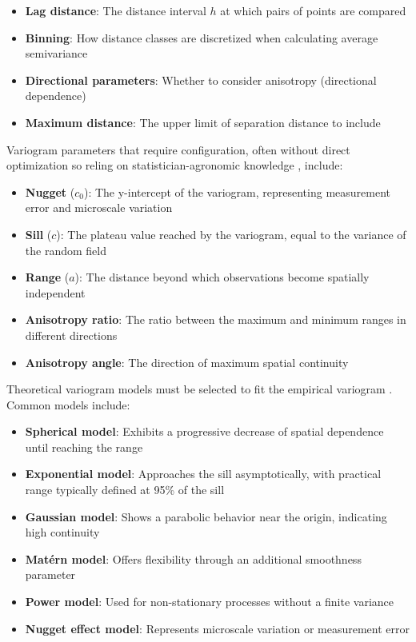 \documentclass[12pt,a4paper,oneside]{report}
\begin{document}
\begin{itemize} 
    \item \textbf{Lag distance}: The distance interval $h$ at which pairs of points are compared 
    \item \textbf{Binning}: How distance classes are discretized when calculating average semivariance 
    \item \textbf{Directional parameters}: Whether to consider anisotropy (directional dependence) 
    \item \textbf{Maximum distance}: The upper limit of separation distance to include 
\end{itemize}

Variogram parameters that require configuration, often without direct 
optimization so reling on statistician-agronomic knowledge
\cite{mullerGeostatisticalModellingPython2022}, 
include:

\begin{itemize} 
    \item \textbf{Nugget} ($c_0$): The y-intercept of the variogram, representing measurement error and microscale variation 
    \item \textbf{Sill} ($c$): The plateau value reached by the variogram, equal to the variance of the random field 
    \item \textbf{Range} ($a$): The distance beyond which observations become spatially independent 
    \item \textbf{Anisotropy ratio}: The ratio between the maximum and minimum ranges in different directions 
    \item \textbf{Anisotropy angle}: The direction of maximum spatial continuity 
\end{itemize}

Theoretical variogram models must be selected to fit the empirical variogram
\cite{cressieStatisticsSpatialData2015, goovaertsGeostatisticsNaturalResources1997}. 
Common models include:

\begin{itemize} 
    \item \textbf{Spherical model}: Exhibits a progressive decrease of spatial dependence until reaching the range 
    \item \textbf{Exponential model}: Approaches the sill asymptotically, with practical range typically defined at 95\% of the sill 
    \item \textbf{Gaussian model}: Shows a parabolic behavior near the origin, indicating high continuity 
    \item \textbf{Matérn model}: Offers flexibility through an additional smoothness parameter 
    \item \textbf{Power model}: Used for non-stationary processes without a finite variance 
    \item \textbf{Nugget effect model}: Represents microscale variation or measurement error 
\end{itemize}
\end{document}
